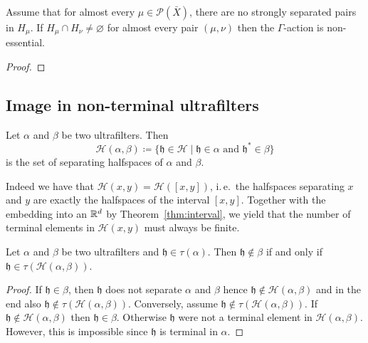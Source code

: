 \begin{cor}[{\cite[Corollary~4.21]{MR3509968}}]
  \label{cor:4.21}
  Assume that for almost every \(\mu \in \mathcal{P}(\bar X)\), there are no strongly separated pairs in \(H_\mu\). If \(H_\mu \cap H_\nu \neq \varnothing\) for almost every pair \((\mu, \nu)\) then the \(\Gamma\)-action is non-essential.
\end{cor}

\begin{proof}
\end{proof}

\subsection{Image in non-terminal ultrafilters}
\label{sec:nt-uf}


\begin{defin}
  Let \(\alpha\) and \(\beta\) be two ultrafilters. Then
  \[
    \mathcal{H}(\alpha,\beta) \coloneqq \{\mathfrak{h} \in \mathcal{H} \mid \mathfrak{h} \in \alpha \text{ and } \mathfrak{h}^\ast \in \beta\}
  \]
  is the set of separating halfspaces of \(\alpha\) and \(\beta\).
\end{defin}

\begin{rem}
  \label{rem:interval}
  Indeed we have that \(\mathcal{H}(x,y) = \mathcal{H}([x,y])\), i.\,e.\ the halfspaces separating \(x\) and \(y\) are exactly the halfspaces of the interval \([x,y]\). Together with the embedding into an \(\mathbb{R}^d\) by Theorem~\ref{thm:interval}, we yield that the number of terminal elements in \(\mathcal{H}(x,y)\) must always be finite.
\end{rem}

\begin{lemma}[{\cite[Lemma~4.12]{MR3509968}}]
  \label{lem:4.12}
  Let \(\alpha\) and \(\beta\) be two ultrafilters and \(\mathfrak{h} \in \tau(\alpha)\). Then \(\mathfrak{h} \notin \beta\) if and only if \(\mathfrak{h} \in \tau(\mathcal{H}(\alpha,\beta))\).
\end{lemma}

\begin{proof}
  If \(\mathfrak{h} \in \beta\), then \(\mathfrak{h}\) does not separate \(\alpha\) and \(\beta\) hence \(\mathfrak{h} \notin \mathcal{H}(\alpha, \beta)\) and in the end also \(\mathfrak{h} \notin \tau(\mathcal{H}(\alpha, \beta))\). Conversely, assume \(\mathfrak{h} \notin \tau(\mathcal{H}(\alpha, \beta))\). If \(\mathfrak{h} \notin \mathcal{H}(\alpha, \beta)\) then \(\mathfrak{h} \in \beta\). Otherwise \(\mathfrak{h}\) were not a terminal element in \(\mathcal{H}(\alpha, \beta)\). However, this is impossible since \(\mathfrak{h}\) is terminal in \(\alpha\).
\end{proof}

